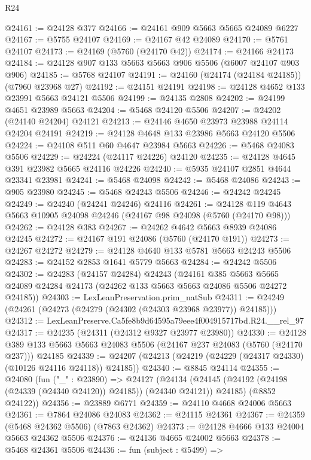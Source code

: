 \begin{lexlean}{R24}
\begin{coremodule}
@24161 := @24128 @377
@24166 := @24161 @909 @5663 @5665 @24089 @6227
@24167 := @5755 @24107
@24169 := @24167 @42 @24089
@24170 := @5761 @24107
@24173 := @24169 (@5760 (@24170 @42))
@24174 := @24166 @24173
@24184 := @24128 @907 @133 @5663 @5663 @906 @5506 (@6007 @24107 @903 @906)
@24185 := @5768 @24107
@24191 := @24160 (@24174 (@24184 @24185)) (@7960 @23968 @27)
@24192 := @24151 @24191
@24198 := @24128 @4652 @133 @23991 @5663 @24121 @5506
@24199 := @24135 @2808
@24202 := @24199 @4651 @23989 @5663
@24204 := @5468 @24120 @5506
@24207 := @24202 (@24140 @24204) @24121
@24213 := @24146 @4650 @23973 @23988 @24114 @24204 @24191
@24219 := @24128 @4648 @133 @23986 @5663 @24120 @5506
@24224 := @24108 @511 @60 @4647 @23984 @5663
@24226 := @5468 @24083 @5506
@24229 := @24224 (@24117 @24226) @24120
@24235 := @24128 @4645 @391 @23982 @5665 @24116 @24226
@24240 := @5935 @24107 @2851 @4644 @23341 @23981
@24241 := @5468 @24098
@24242 := @5468 @24086
@24243 := @905 @23980
@24245 := @5468 @24243 @5506
@24246 := @24242 @24245
@24249 := @24240 (@24241 @24246) @24116
@24261 := @24128 @119 @4643 @5663 @10905 @24098 @24246 (@24167 @98 @24098 (@5760 (@24170 @98)))
@24262 := @24128 @383
@24267 := @24262 @4642 @5663 @8939 @24086 @24245
@24272 := @24167 @191 @24086 (@5760 (@24170 @191))
@24273 := @24267 @24272
@24279 := @24128 @4640 @133 @5781 @5663 @24243 @5506
@24283 := @24152 @2853 @1641 @5779 @5663
@24284 := @24242 @5506
@24302 := @24283
    (@24157 @24284)
    @24243
    (@24161
      @385
      @5663
      @5665
      @24089
      @24284
      @24173
      (@24262 @133 @5663 @5663 @24086 @5506 @24272 @24185))
@24303 := LexLeanPreservation.prim_natSub
@24311 := @24249 (@24261 (@24273 (@24279 (@24302 (@24303 @23968 @23977)) @24185)))
@24312 := LexLeanPreserve.Ca5fe8b9d64595a79eee4f004915717bd.R24.__rel_97
@24317 := @24235 (@24311 (@24312 @9327 @23977 @23980))
@24330 := @24128
    @389
    @133
    @5663
    @5663
    @24083
    @5506
    (@24167 @237 @24083 (@5760 (@24170 @237)))
    @24185
@24339 := @24207 (@24213 (@24219 (@24229 (@24317 @24330) (@10126 @24116 @24118)) @24185))
@24340 := @8845 @24114
@24355 := @24080
    (fun ("_" : @23890) =>
    @24127
      (@24134 (@24145 (@24192 (@24198 (@24339 (@24340 @24120)) @24185)) (@24340 @24121)) @24185)
      (@8852 @24122))
@24356 := @23889 @6771
@24359 := @24110 @4668 @24006 @5663
@24361 := @7864 @24086 @24083
@24362 := @24115 @24361
@24367 := @24359 (@5468 @24362 @5506) (@7863 @24362)
@24373 := @24128 @4666 @133 @24004 @5663 @24362 @5506
@24376 := @24136 @4665 @24002 @5663
@24378 := @5468 @24361 @5506
@24436 := fun (subject : @5499) =>

\end{coremodule}
\end{lexlean}
